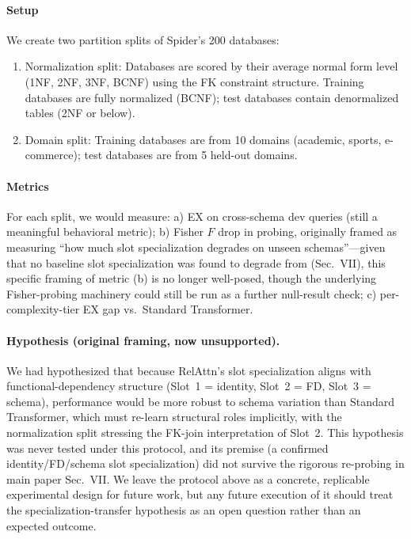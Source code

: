 \documentclass[conference]{IEEEtran}
\begin{document}
\paragraph{Setup} We create two partition splits of Spider's 200 databases:
\begin{enumerate}[noitemsep,topsep=2pt]
  \item {Normalization split}: Databases are scored by their average normal form level (1NF, 2NF, 3NF, BCNF) using the FK constraint structure. Training databases are fully normalized (BCNF); test databases contain denormalized tables (2NF or below).
  \item {Domain split}: Training databases are from 10 domains (academic, sports, e-commerce); test databases are from 5 held-out domains.
\end{enumerate}

\paragraph{Metrics} For each split, we would measure: a) EX on cross-schema dev queries (still a meaningful behavioral metric); b) Fisher $F$ drop in probing, originally framed as measuring ``how much slot specialization degrades on unseen schemas''---given that no baseline slot specialization was found to degrade from (Sec.~VII), this specific framing of metric (b) is no longer well-posed, though the underlying Fisher-probing machinery could still be run as a further null-result check; c) per-complexity-tier EX gap vs.\ Standard Transformer.

\paragraph{Hypothesis (original framing, now unsupported).} We had hypothesized that because RelAttn's slot specialization aligns with functional-dependency structure (Slot~1 = identity, Slot~2 = FD, Slot~3 = schema), performance would be more robust to schema variation than Standard Transformer, which must re-learn structural roles implicitly, with the normalization split stressing the FK-join interpretation of Slot~2. This hypothesis was never tested under this protocol, and its premise (a confirmed identity/FD/schema slot specialization) did not survive the rigorous re-probing in main paper Sec.~VII. We leave the protocol above as a concrete, replicable experimental design for future work, but any future execution of it should treat the specialization-transfer hypothesis as an open question rather than an expected outcome.
\end{document}
